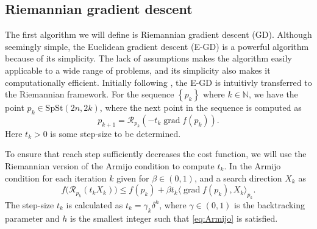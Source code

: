 \subsection{Riemannian gradient descent}
The first algorithm we will define is Riemannian gradient descent (GD). Although seemingly simple, the Euclidean gradient descent (E-GD) is a powerful algorithm because of its simplicity. The lack of assumptions makes the algorithm easily applicable to a wide range of problems, and its simplicity also makes it computationally efficient. Initially following \cite[p.~56]{Boumal2023}, the E-GD is intuitivly transferred to the Riemannian framework. For the sequence $\left\{ p_{k} \right\}$ where $k\in \mathbb{N}$, we have the point $p_{k}\in \mathrm{SpSt}(2n, 2k)$, where the next point in the sequence is computed as 
%
\begin{equation*}
p_{k+1}=\mathcal{R}_{p_{k}}(-t_{k}\operatorname{grad}f(p_{k})).
\end{equation*}
%
Here $t_{k}>0$ is some step-size to be determined. 

To ensure that reach step sufficiently decreases the cost function, we will use the Riemannian version of the Armijo condition to compute $t_{k}$. In \cite[p.~17]{GaoSonAbsilStykel2021} the Armijo condition for each iteration $k$ given for $\beta \in(0,1)$, and a search direction $X_{k}$ as
%
\begin{equation}\label{eq:Armijo}
f\big(\mathcal{R}_{p_{k}}(t_{k}X_{k})\big)\leq f(p_{k})+\beta t_{k}\langle \operatorname{grad}f(p_{k}),X_{k} \rangle _{p_{k}}.
\end{equation}
%
The step-size $t_{k}$ is calculated as $t_{k}=\gamma_{k}\delta^{h}$, where $\gamma\in(0,1)$ is the backtracking parameter and $h$ is the smallest integer such that \eqref{eq:Armijo} is satisfied. 


